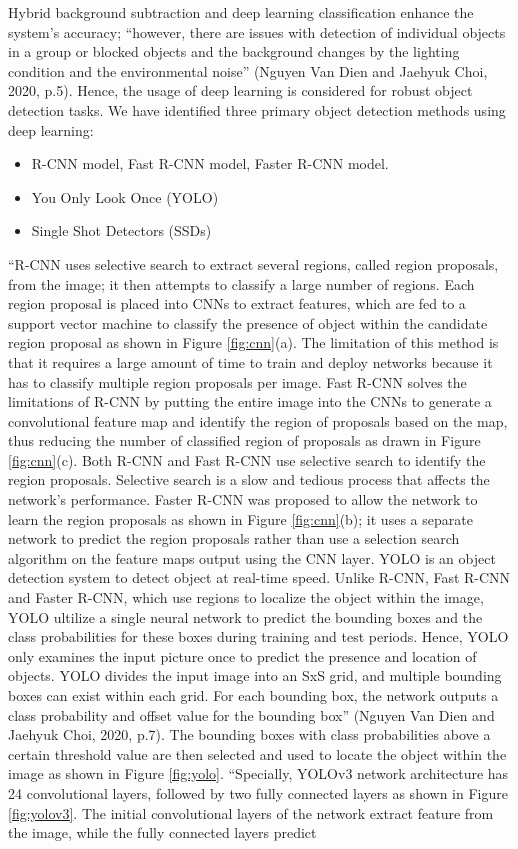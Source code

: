 Hybrid background subtraction and deep learning classification enhance the system’s accuracy; “however, there are issues with detection of individual objects in a group or blocked objects and the background changes by the lighting condition and the environmental noise” (Nguyen Van Dien and Jaehyuk Choi, 2020, p.5). Hence, the usage of deep learning is considered for robust object detection tasks. We have identified three primary object detection methods using deep learning:
\begin{itemize}
\item R-CNN model, Fast R-CNN model, Faster R-CNN model.
\item You Only Look Once (YOLO)
\item Single Shot Detectors (SSDs) 
\end{itemize}
“R-CNN \cite{girshick2014rich} uses selective search \cite{uijlings2013selective} to extract several regions, called region proposals, from the image; it then attempts to classify a large number of regions. Each region proposal is placed into CNNs to extract features, which are fed to a support vector machine to classify the presence of object within the candidate region proposal as shown in Figure \ref{fig:cnn}(a). The limitation of this method is that it requires a large amount of time to train and deploy networks because it has to classify multiple region proposals per image. Fast R-CNN \cite{girshick2015fast} solves the limitations of R-CNN by putting the entire image into the CNNs to generate a convolutional feature map and identify the region of proposals based on the map, thus reducing the number of classified region of proposals as drawn in Figure \ref{fig:cnn}(c). Both R-CNN and Fast R-CNN use selective search to identify the region proposals. Selective search is a slow and tedious process that affects the network’s performance. Faster R-CNN \cite{ren2015faster} was proposed to allow the network to learn the region proposals as shown in Figure \ref{fig:cnn}(b); it uses a separate network to predict the region proposals rather than use a selection search algorithm on the feature maps output using the CNN layer. YOLO \cite{redmon2016you} is an object detection system to detect object at real-time speed. Unlike R-CNN, Fast R-CNN and Faster R-CNN, which use regions to localize the object within the image, YOLO ultilize a single neural network to predict the bounding boxes and the class probabilities for these boxes during training and test periods. Hence, YOLO only examines the input picture once to predict the presence and location of objects. YOLO divides the input image into an SxS grid, and multiple bounding boxes can exist within each grid. For each bounding box, the network outputs a class probability and offset value for the bounding box” (Nguyen Van Dien and Jaehyuk Choi, 2020, p.7). The bounding boxes with class probabilities above a certain threshold value are then selected and used to locate the object within the image as shown in Figure \ref{fig:yolo}. “Specially, YOLOv3 network architecture has 24 convolutional layers, followed by two fully connected layers as shown in Figure \ref{fig:yolov3}. The initial convolutional layers of the network extract feature from the image, while the fully connected layers predict 